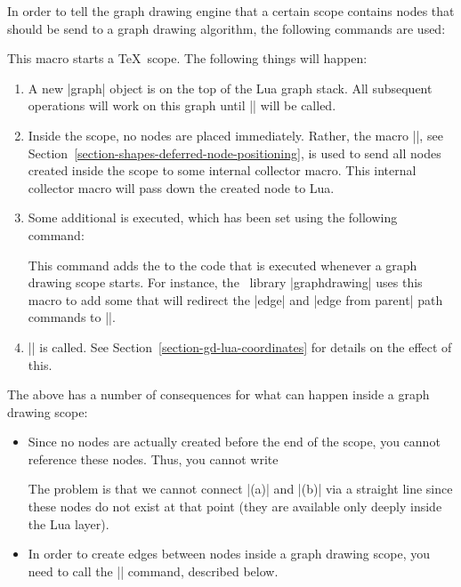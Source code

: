 In order to tell the graph drawing engine that a certain scope
contains nodes that should be send to a graph drawing algorithm, the
following commands are used:

\begin{command}{\pgfgdbeginscope}
  This macro starts a \TeX\ scope. The following things will happen:
  \begin{enumerate}
  \item A new |graph| object is on the top of the Lua graph stack. All
    subsequent operations will work on this graph until
    |\pgfgdendscope| will be called.
  \item Inside the scope, no nodes are placed immediately. Rather, 
    the macro |\pgfpositionnodelater|, see
    Section~\ref{section-shapes-deferred-node-positioning}, is used to
    send all nodes created inside the scope to some internal collector
    macro. This internal collector macro will pass down the created
    node to Lua.
  \item Some additional  is executed, which has been set
    using the following command:
    \begin{command}{\pgfgdaddspecificationhook{}}
      This command adds the  to the code that is executed
      whenever a graph drawing scope starts. For instance, the
      \tikzname\ library |graphdrawing| uses this macro to add some
       that will redirect the |edge| and |edge from parent|
      path commands to |\pgfgdedge|.
    \end{command}
  \item |\pgftransformreset| is called. See
    Section~\ref{section-gd-lua-coordinates} for details on the effect
    of this.
  \end{enumerate}
  The above has a number of consequences for what can happen inside a
  graph drawing scope:
  \begin{itemize}
  \item Since no nodes are actually created before the end of the
    scope, you cannot reference these nodes. Thus, you cannot write
\begin{codeexample}
\end{codeexample}
    The problem is that we cannot connect |(a)| and |(b)| via a
    straight line since these nodes do not exist at that point (they
    are available only deeply inside the Lua layer).
  \item In order to create edges between nodes inside a graph drawing
    scope, you need to call the |\pgfgdedge| command, described below.
  \end{itemize}
\end{command}


